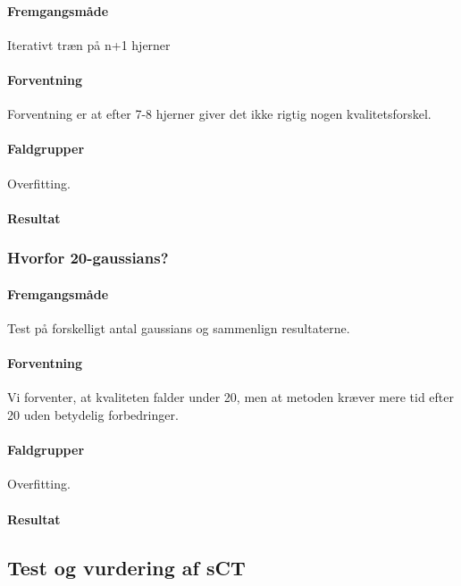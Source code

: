 \paragraph{Fremgangsmåde}
Iterativt træn på n+1 hjerner

\paragraph{Forventning}
Forventning er at efter 7-8 hjerner giver det ikke rigtig nogen
kvalitetsforskel.

\paragraph{Faldgrupper}
Overfitting. 


\paragraph{Resultat}

\subsubsection{Hvorfor 20-gaussians?}

\paragraph{Fremgangsmåde}
Test på forskelligt antal gaussians og sammenlign resultaterne.

\paragraph{Forventning}
Vi forventer, at kvaliteten falder under 20, men at metoden kræver mere tid
efter 20 uden betydelig forbedringer.

\paragraph{Faldgrupper}
Overfitting. 

\paragraph{Resultat}



\subsection{Test og vurdering af sCT}

